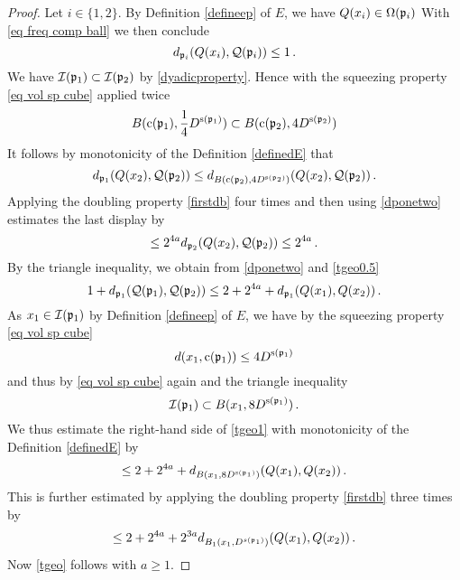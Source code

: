 \begin{proof}
Let $i\in \{1,2\}$.
By Definition \eqref{defineep} of $E$,
we have ${Q}(x_i)\in \Omega(\mathfrak p_i)$
With \eqref{eq freq comp ball} we then conclude
\begin{equation}\label{dponetwo}
    d_{\mathfrak p_i}({Q}(x_i),\mathcal{Q}(\mathfrak p_i))\le 1\, .
\end{equation}
We have $\mathcal{I}(\mathfrak p_1)\subset \mathcal{I}(\mathfrak p_2)$ by \eqref{dyadicproperty}.
Hence with the squeezing property \eqref{eq vol sp cube} applied twice
\begin{equation}
B(\mathrm{c}(\mathfrak p_1),\frac 14 D^{\mathrm{s}(\mathfrak p_1)})
\subset B(\mathrm{c}(\mathfrak p_2), 4 D^{\mathrm{s}(\mathfrak p_2)})
\end{equation}
It follows
by monotonicity of the Definition \eqref{definedE} that
\begin{equation}
    d_{\mathfrak p_1}({Q}(x_2),\mathcal{Q}(\mathfrak p_2))\le
    d_{ B(\mathrm{c}(\mathfrak p_2), 4 D^{\mathrm{s}(\mathfrak p_2)})}({Q}(x_2),\mathcal{Q}(\mathfrak p_2))
    \, .
\end{equation}
Applying the doubling property \eqref{firstdb} four times and then using \eqref{dponetwo} estimates the last display by
\begin{equation}\label{tgeo0.5}
    \le 2^{4a} d_{\mathfrak p_2}({Q}(x_2),\mathcal{Q}(\mathfrak p_2))\le 2^{4a}
    \, .
\end{equation}
By the triangle inequality, we obtain from \eqref{dponetwo} and
\eqref{tgeo0.5}
\begin{equation}\label{tgeo1}
        1+d_{\mathfrak p_1}(\mathcal{Q}(\mathfrak p_1), \mathcal{Q}(\mathfrak p_2))\le  2+2^{4a} +d_{\mathfrak p_1}({Q}(x_1), {Q}(x_2))\, .
\end{equation}
As $x_1\in \mathcal{I}(\mathfrak p_1)$ by Definition \eqref{defineep} of $E$, we have by the squeezing property  \eqref{eq vol sp cube}
\begin{equation}
    d(x_1,\mathrm{c}(\mathfrak p_1))\le 4D^{\mathrm{s}(\mathfrak p_1)}
\end{equation}
and thus by \eqref{eq vol sp cube} again and the triangle inequality
\begin{equation}
    \mathcal{I}(\mathfrak p_1)\subset B(x_1,8D^{\mathrm{s}(\mathfrak p_1)})\, .
\end{equation}
We thus estimate the right-hand side of \eqref{tgeo1} with monotonicity of the  Definition \eqref{definedE} by
\begin{equation}\label{tgeo1.5}
    \le  2+2^{4a}+d_{B(x_1,8D^{\mathrm{s}(\mathfrak p_1)})}({Q}(x_1), {Q}(x_2))\, .
\end{equation}
This is further estimated by applying the doubling property  \eqref{firstdb} three times by
\begin{equation}\label{tgeo2}
    \le  2+2^{4a}+2^{3a}d_{B_1(x_1, D^{s(\mathfrak p_1)})}({Q}(x_1), {Q}(x_2))\, .
\end{equation}
Now \eqref{tgeo} follows with $a\ge 1$.
\end{proof}




